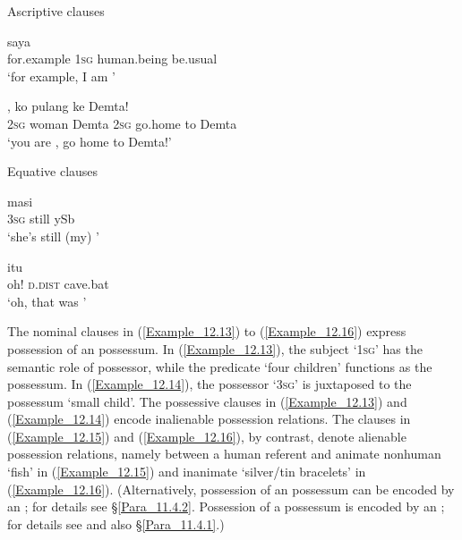 \begin{styleExampleTitle}
Ascriptive clauses
\end{styleExampleTitle}

\ea
\label{Example_12.9}
 {saya} {} {}\\ %
 for.example  \textsc{1sg}  human.being  be.usual\\
 ‘for example, I am ’ \textstyleExampleSource{[081006-022-CvEx.0025]}
\z

\ea
\label{Example_12.10}
 {} {,} {ko} {pulang} {ke} {Demta}\textup{!}\\ %
 \textsc{2sg}  woman  Demta  \textsc{2sg}  go.home  to  Demta\\
\glt 
‘you are , go home to Demta!’ \textstyleExampleSource{[081006-025-CvEx.0014]}
\z

\begin{styleExampleTitle}
Equative clauses
\end{styleExampleTitle}

\ea
\label{Example_12.11}
 {masi} {}\\ %
 \textsc{3sg}  still  ySb\\
\glt 
‘she’s still (my) ’ \textstyleExampleSource{[080927-009-CvNP.0038]}
\z

\ea
\label{Example_12.12}
 {itu} {}\\ %
 oh!  \textsc{d.dist}  cave.bat\\
\glt 
‘oh, that was ’ \textstyleExampleSource{[081023-001-Cv.0041]}
\z


The nominal clauses in (\ref{Example_12.13}) to (\ref{Example_12.16}) express possession of an  possessum. In (\ref{Example_12.13}), the subject  ‘1\textsc{sg}’ has the semantic role of possessor, while the predicate  ‘four children’ functions as the possessum. In (\ref{Example_12.14}), the possessor  ‘3\textsc{sg}’ is juxtaposed to the possessum  ‘small child’. The possessive clauses in (\ref{Example_12.13}) and (\ref{Example_12.14}) encode inalienable possession relations. The clauses in (\ref{Example_12.15}) and (\ref{Example_12.16}), by contrast, denote alienable possession relations, namely between a human referent and animate nonhuman  ‘fish’ in (\ref{Example_12.15}) and inanimate  ‘silver/tin bracelets’ in (\ref{Example_12.16}). (Alternatively, possession of an  possessum can be encoded by an ; for details see §\ref{Para_11.4.2}. Possession of a  possessum is encoded by an ; for details see  and also §\ref{Para_11.4.1}.)


